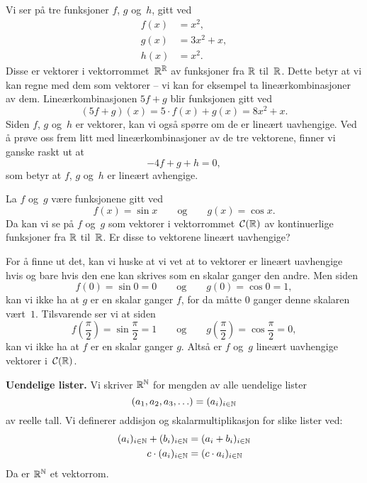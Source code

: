 \begin{ex}
Vi ser på tre funksjoner $f$, $g$ og~$h$, gitt ved
\begin{align*}
f(x) &= x^2, \\
g(x) &= 3x^2 + x, \\
h(x) &= x^2.
\end{align*}
Disse er vektorer i vektorrommet~$\mathbb{R}^{\mathbb{R}}$ av funksjoner fra $\mathbb{R}$
til~$\mathbb{R}$.  Dette betyr at vi kan regne med dem som vektorer -- vi kan
for eksempel ta lineærkombinasjoner av dem.  Lineærkombinasjonen
$5f + g$ blir funksjonen gitt ved
\[
(5f + g)(x) = 5 \cdot f(x) + g(x) = 8x^2 + x.
\]
Siden $f$, $g$ og~$h$ er vektorer, kan vi også spørre om de er lineært
uavhengige.  Ved å prøve oss frem litt med lineærkombinasjoner av de
tre vektorene, finner vi ganske raskt ut at
\[
-4f + g + h = 0,
\]
som betyr at $f$, $g$ og~$h$ er lineært avhengige.
\end{ex}

\begin{ex}
\label{ex:sin-cos-lin-uavh}
La $f$ og~$g$ være funksjonene gitt ved
\[
f(x) = \sin x
\qquad\text{og}\qquad
g(x) = \cos x.
\]
Da kan vi se på $f$ og~$g$ som vektorer i vektorrommet~$\mathcal{C}(\mathbb{R})$ av
kontinuerlige funksjoner fra $\mathbb{R}$ til~$\mathbb{R}$.  Er disse to vektorene
lineært uavhengige?

For å finne ut det, kan vi huske at vi vet at to vektorer er lineært
uavhengige hvis og bare hvis den ene kan skrives som en skalar ganger
den andre.  Men siden
\[
f(0) = \sin 0 = 0
\qquad\text{og}\qquad
g(0) = \cos 0 = 1,
\]
kan vi ikke ha at $g$ er en skalar ganger $f$, for da måtte $0$ ganger
denne skalaren vært~$1$.  Tilsvarende ser vi at siden
\[
f\left(\frac{\pi}{2}\right) = \sin \frac{\pi}{2} = 1
\qquad\text{og}\qquad
g\left(\frac{\pi}{2}\right) = \cos \frac{\pi}{2} = 0,
\]
kan vi ikke ha at $f$ er en skalar ganger $g$.  Altså er $f$ og~$g$
lineært uavhengige vektorer i~$\mathcal{C}(\mathbb{R})$.
\end{ex}

\medskip\noindent\textbf{Uendelige lister. }%
Vi skriver $\mathbb{R}^{\mathbb{N}}$ for mengden av alle uendelige lister
\[
(a_1, a_2, a_3, \ldots) = (a_i)_{i \in \mathbb{N}}
\]
av reelle tall.  Vi definerer addisjon og skalarmultiplikasjon for
slike lister ved:
\begin{align*}
(a_i)_{i \in \mathbb{N}} + (b_i)_{i \in \mathbb{N}} &= (a_i + b_i)_{i \in \mathbb{N}} \\
c \cdot (a_i)_{i \in \mathbb{N}} &= (c \cdot a_i)_{i \in \mathbb{N}}
\end{align*}
Da er $\mathbb{R}^{\mathbb{N}}$ et vektorrom.

\begin{ex}

\end{ex}

